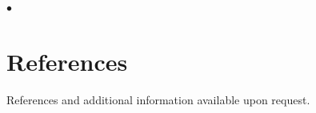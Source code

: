 \documentclass[margin,line,10pt]{res}
\newenvironment{list2}{
  \begin{list}{$\bullet$}{%
      \setlength{\itemsep}{0in}
      \setlength{\parsep}{0in} \setlength{\parskip}{0in}
      \setlength{\topsep}{0in} \setlength{\partopsep}{0in} 
      \setlength{\leftmargin}{0.2in}}}{\end{list}}
\begin{document}
\begin{resume}
\begin{list2}
\begin{itemize}
  \end{itemize}

 
  
\end{list2}




\vspace{0.5cm}
\section{\sc References}
References and additional information available upon request. 

\end{resume}
\end{document}
